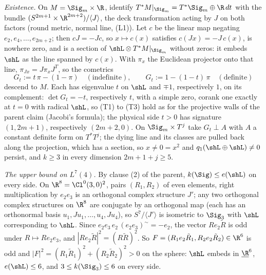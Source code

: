 \emph{Existence.} On $M = \Sig_{m} \times \R$, identify $T^{*}M|_{\Sig_{m}} = T^{*}\Sig_{m} \oplus \R\,dt$ with the bundle $(S^{2m+1} \times \R^{2m+2})/\langle J \rangle$, the deck transformation acting by $J$ on both factors (round metric, normal line, (L1)). Let $c$ be the linear map negating $e_{2}, e_{4}, \dots, e_{2m+2}$; then $cJ = -Jc$, so $x \mapsto c(x)$ satisfies $c(Jx) = -J\,c(x)$, is nowhere zero, and is a section of $\shL \otimes T^{*}M|_{\Sig_{m}}$ without zeros: it embeds $\shL$ as the line spanned by $c(x)$. With $\pi_{x}$ the Euclidean projector onto that line, $\pi_{Jx} = J \pi_{x} J^{T}$, so the cometrics
\[
G_{t} := t\,\pi - (1 - \pi) \quad (\text{indefinite}), \qquad G_{t} := 1 - (1 - t)\,\pi \quad (\text{definite})
\]
descend to $M$. Each has eigenvalue $t$ on $\shL$ and $\mp 1$, respectively $1$, on its complement: $\det G_{t} = -t$, respectively $t$, with a simple zero, corank one exactly at $t = 0$ with radical $\shL$, so (T1) to (T3) hold as for the projective walls of the parent claim (Jacobi's formula); the physical side $t > 0$ has signature $(1, 2m+1)$, respectively $(2m+2, 0)$. On $\Sig_{m} \times T^{j}$ take $G_{t} \perp A$ with $A$ a constant definite form on $T^{*}T^{j}$; the dying line and its classes are pulled back along the projection, which has a section, so $x \neq 0 = x^{2}$ and $q_{1}(\shL \oplus \shL) \neq 0$ persist, and $k \geq 3$ in every dimension $2m+1+j \geq 5$.

\emph{The upper bound on $L^{7}(4)$.} By clause (2) of the parent, $k(\Sig) \le e(\shL)$ on every side. On $\R^{8} = \Cl^{0}(3,0)^{2}$, pairs $(R_{1}, R_{2})$ of even elements, right multiplication by $e_{2}e_{3}$ is an orthogonal complex structure $J'$; any two orthogonal complex structures on $\R^{8}$ are conjugate by an orthogonal map (each has an orthonormal basis $u_{1}, J u_{1}, \dots, u_{4}, J u_{4}$), so $S^{7}/\langle J' \rangle$ is isometric to $\Sig_{3}$ with $\shL$ corresponding to $\shL$. Since $e_{2}e_{3}\, e_{2}\, (e_{2}e_{3})^{\sim} = -e_{2}$, the vector $R e_{2} \tilde R$ is odd under $R \mapsto R e_{2}e_{3}$, and $|R e_{2}\tilde R|^{2} = (R\tilde R)^{2}$. So $F = (R_{1}e_{2}\tilde R_{1}, R_{2} e_{2} \tilde R_{2}) \in \R^{6}$ is odd and $|F|^{2} = (R_{1}\tilde R_{1})^{2} + (R_{2}\tilde R_{2})^{2} > 0$ on the sphere: $\shL$ embeds in $\underline{\R}^{6}$, $e(\shL) \le 6$, and $3 \le k(\Sig_{3}) \le 6$ on every side.

